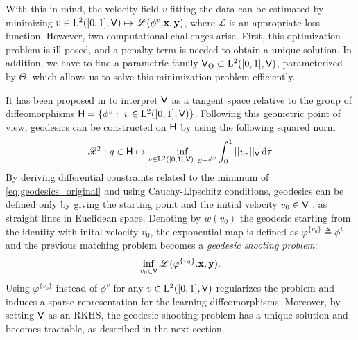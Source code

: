 With this in mind, the velocity field $v$ fitting the data can be
estimated by minimizing 
$v \in \mathrm{L}^2([0,1],\mathsf{V}) \mapsto \mathscr{L}(\phi^{v}.\mathbf{x},\mathbf{y})$, where $\mathscr{L}$ is an appropriate loss function.
 However, two computational challenges arise.
  First, this optimization problem is ill-posed, and a penalty term is needed to obtain a unique solution.
   In addition, we have to find a parametric family $\mathsf{V}_{\Theta} \subset \mathrm{L}^2([0,1],\mathsf{V})$, parameterized by $\Theta$, which allows us to solve this minimization problem efficiently. 

It has been proposed in \cite{miller2006geodesic} to interpret $\mathsf{V}$ as a tangent space relative to the group of diffeomorphisms $\mathsf{H}=\{ \phi^v:\; v\in \mathrm{L}^2([0,1],\mathsf{V})\}$.
Following this geometric point of view, geodesics can be constructed on $\mathsf{H}$ by using the following squared norm 
 \begin{equation}
  \label{eq:geodesics_original}
    \mathscr{R}^2: g\in \mathsf{H}\mapsto \inf_{ v\in \mathrm{L}^2([0,1],\mathsf{V}):\; g=\phi^v} \int_0^1 || v_\tau||_{\mathsf{V}}\mathop{}\!\mathrm{d} \tau
 \end{equation}
By deriving differential constraints related to the minimum of \eqref{eq:geodesics_original} and using Cauchy-Lipschitz conditions, geodesics can be defined only by giving the starting point and the initial velocity $v_0\in \mathsf{V}$ \cite{miller2006geodesic}, as straight lines in Euclidean space.
Denoting by $w(v_0)$ the geodesic starting from the identity with inital velocity $v_0$, the exponential map is defined as $\varphi^{\{v_0\}}\triangleq \phi^v$ and the previous matching problem becomes a \textit{geodesic shooting problem}:
 \begin{equation}
  \label{eq:geodesics_shooting}
  \inf_{v_0 \in \mathsf{V}} \mathscr{L}(\varphi^{\{v_0\}}.\mathbf{x},\mathbf{y}).
 \end{equation}
 Using $\varphi^{\{v_0\}}$ instead of $\phi^v$ for any $v\in \mathrm{L}^2([0,1],\mathsf{V})$ regularizes the problem and induces a sparse representation for the learning diffeomorphisms.
 Moreover, by setting $\mathsf{V}$ as an RKHS, the geodesic shooting problem has a unique solution and becomes tractable, as described in the next section.




